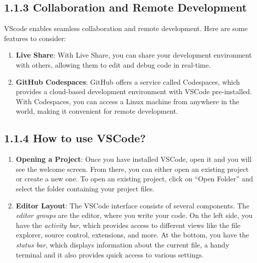 \documentclass[
  paper=a4,
  ,captions=tableheading
]{scrbook}
\providecommand{\tightlist}{%
  \setlength{\itemsep}{0pt}\setlength{\parskip}{0pt}}
\begin{document}
\hypertarget{collaboration-and-remote-development}{%
\subsection{1.1.3 Collaboration and Remote
Development}\label{collaboration-and-remote-development}}

VScode enables seamless collaboration and remote development. Here are
some features to consider:

\begin{enumerate}
\def\labelenumi{\arabic{enumi}.}
\tightlist
\item
  \textbf{Live Share}: With Live Share, you can share your development
  environment with others, allowing them to edit and debug code in
  real-time.
\item
  \textbf{GitHub Codespaces}: GitHub offers a service called Codespaces,
  which provides a cloud-based development environment with VSCode
  pre-installed. With Codespaces, you can access a Linux machine from
  anywhere in the world, making it convenient for remote development.
\end{enumerate}

\hypertarget{how-to-use-vscode}{%
\subsection{1.1.4 How to use VSCode?}\label{how-to-use-vscode}}

\begin{enumerate}
\def\labelenumi{\arabic{enumi}.}
\tightlist
\item
  \textbf{Opening a Project}: Once you have installed VSCode, open it
  and you will see the welcome screen. From there, you can either open
  an existing project or create a new one. To open an existing project,
  click on \enquote{Open Folder} and select the folder containing your
  project files.
\item
  \textbf{Editor Layout}: The VSCode interface consists of several
  components. The \emph{editor groups} are the editor, where you write
  your code. On the left side, you have the \emph{activity bar}, which
  provides access to different views like the file explorer, source
  control, extensions, and more. At the bottom, you have the
  \emph{status bar}, which displays information about the current file,
  a handy terminal and it also provides quick access to various
  settings.
\end{enumerate}
\end{document}
